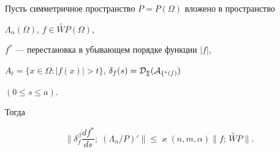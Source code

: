 \begin{thm} 


Пусть симметричное пространство $P=P(\Omega)$ вложено в пространство 


$\Lambda_\alpha(\Omega)$, $f\in\overset{\circ}{W}P(\Omega)$, 


$f^*$ --- перестановка в убывающем порядке функции $|f|$, 


$A_t=\{x\in\Omega:|f(x)|>t\}$, $\delta_f(s)=\cal D_m(A_{f^*(s)})$ 


$(0\le s\le a)$. 


Тогда 


\begin{equation} 




\biggl\| \delta^\beta_f\frac{df^*}{ds};\;(\Lambda_\alpha/P)'\biggr\| \le 


\varkappa(n,m,\alpha)\|f;\,\overset{\circ}{W}P\|. 


\end{equation} 


\end{thm} 


 


